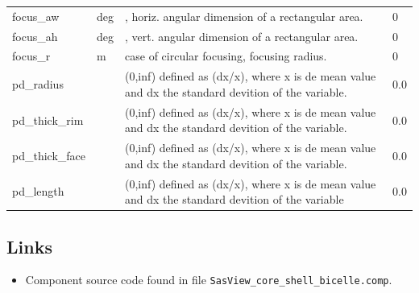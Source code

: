 \begin{longtable}{p{}p{}p{}p{}}
focus\_aw & deg & , horiz. angular dimension of a rectangular area. & 0 \\
focus\_ah & deg & , vert. angular dimension of a rectangular area. & 0 \\
focus\_r & m & case of circular focusing, focusing radius. & 0 \\
pd\_radius &  & (0,inf) defined as (dx/x), where x is de mean value and dx the standard devition of the variable. & 0.0 \\
pd\_thick\_rim &  & (0,inf) defined as (dx/x), where x is de mean value and dx the standard devition of the variable. & 0.0 \\
pd\_thick\_face &  & (0,inf) defined as (dx/x), where x is de mean value and dx the standard devition of the variable. & 0.0 \\
pd\_length &  & (0,inf) defined as (dx/x), where x is de mean value and dx the standard devition of the variable & 0.0 \\
\bottomrule
\end{longtable}

\subsection*{Links}
\begin{itemize}
  \item Component source code found in file \texttt{SasView\_core\_shell\_bicelle.comp}.
\end{itemize}
